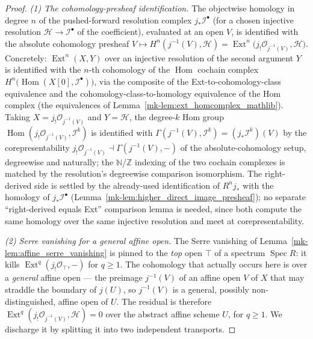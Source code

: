 \begin{proof}
  \emph{(1) The cohomology-presheaf identification.} The objectwise homology in degree
  \(n\) of the pushed-forward resolution complex \(j_*\mathcal{I}^\bullet\) (for a chosen
  injective resolution \(\mathcal{H} \to \mathcal{I}^\bullet\) of the coefficient), evaluated at an open
  \(V\), is identified with the absolute cohomology presheaf
  \(V \mapsto H^n(j^{-1}(V), \mathcal{H}) = \operatorname{Ext}^n\bigl(j_!\mathcal{O}_{j^{-1}(V)},
  \mathcal{H}\bigr)\). Concretely: \(\operatorname{Ext}^n(X, Y)\) over an injective resolution of
  the second argument \(Y\) is identified with the \(n\)-th cohomology of the \(\operatorname{Hom}\)
  cochain complex \(H^n\bigl(\operatorname{Hom}(X[0], \mathcal{I}^\bullet)\bigr)\), via the composite
  of the Ext-to-cohomology-class equivalence and the cohomology-class-to-homology equivalence of the
  Hom complex (the equivalences of Lemma~\ref{mk-lem:ext_homcomplex_mathlib}). Taking \(X = j_!\mathcal{O}_{j^{-1}(V)}\) and \(Y =
  \mathcal{H}\), the degree-\(k\) Hom group \(\operatorname{Hom}(j_!\mathcal{O}_{j^{-1}(V)},
  \mathcal{I}^k)\) is identified with \(\Gamma(j^{-1}(V), \mathcal{I}^k) = (j_*\mathcal{I}^k)(V)\) by
  the corepresentability \(j_!\mathcal{O}_{j^{-1}(V)} \dashv \Gamma(j^{-1}(V), -)\) of the absolute-cohomology setup,
  degreewise and naturally; the \(\mathbb{N}\)/\(\mathbb{Z}\) indexing of the two cochain complexes is
  matched by the resolution's degreewise comparison isomorphism. The right-derived side is settled by
  the already-used identification of \(R^n j_*\) with the homology of \(j_*\mathcal{I}^\bullet\)
  (Lemma~\ref{mk-lem:higher_direct_image_presheaf}); no separate ``right-derived equals Ext'' comparison
  lemma is needed, since both compute the same homology over the same injective resolution and meet at
  corepresentability.

  \emph{(2) Serre vanishing for a general affine open.} The Serre vanishing of
  Lemma~\ref{mk-lem:affine_serre_vanishing} is pinned to the \emph{top} open \(\top\) of a spectrum
  \(\operatorname{Spec} R\): it kills \(\operatorname{Ext}^q(j_!\mathcal{O}_\top, -)\) for \(q \geq 1\).
  The cohomology that actually occurs here is over a \emph{general} affine open --- the preimage
  \(j^{-1}(V)\) of an affine open \(V\) of \(X\) that may straddle
  the boundary of \(j(U)\), so \(j^{-1}(V)\) is a general, possibly non-distinguished, affine open of
  \(U\). The residual is therefore \(\operatorname{Ext}^q(j_!\mathcal{O}_{j^{-1}(V)}, \mathcal{H}) = 0\)
  over the abstract affine scheme \(U\), for \(q \geq 1\). We discharge it by splitting it into two
  independent transports.


\end{proof}
